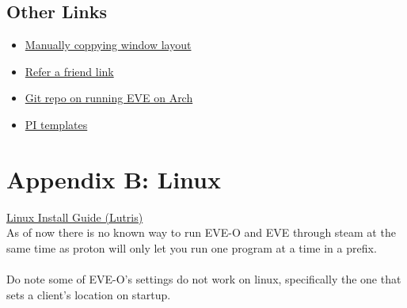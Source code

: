 \documentclass{article}
\begin{document}
\subsection*{Other Links}
\begin{itemize}
  \item \href{https://forums.eveonline.com/t/manually-copy-settings-between-characters-and-accounts/32704}{Manually coppying window layout}
  \item \href{https://www.eveonline.com/signup?invc=79ffb3de-ef43-400b-a568-e45ac72c6715}{Refer a friend link}
  \item \href{https://gist.github.com/arillat/2b7e519a69268f519d507d0ed50b9713}{Git repo on running EVE on Arch}
  \item \href{https://github.com/DalShooth/EVE_PI_Templates}{PI templates}
\end{itemize}

\section*{Appendix B: Linux}
\href{https://www.reddit.com/r/Eve/comments/1hqjm4a/linux_lutris_eve_online_eveo_preview/}{Linux Install Guide (Lutris)}\\
As of now there is no known way to run EVE-O and EVE through steam at the same time as proton will only let you run one program 
at a time in a prefix.
\\
\\
Do note some of EVE-O's settings do not work on linux, specifically the one that sets a client's location on startup.



\end{document}
